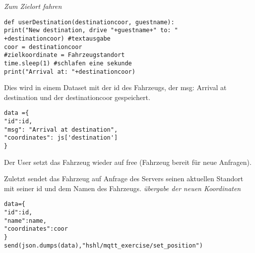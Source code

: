\textit{Zum Zielort fahren}
\begin{lstlisting}
def userDestination(destinationcoor, guestname):
print("New destination, drive "+guestname+" to: "
+destinationcoor) #textausgabe
coor = destinationcoor 
#zielkoordinate = Fahrzeugstandort
time.sleep(1) #schlafen eine sekunde
print("Arrival at: "+destinationcoor)
\end{lstlisting}

Dies wird in einem Dataset mit der id des Fahrzeugs, der msg: Arrival at destination und der destinationcoor gespeichert.

\begin{lstlisting}
data ={
"id":id,
"msg": "Arrival at destination",
"coordinates": js['destination']
}
\end{lstlisting}
Der User setzt das Fahrzeug wieder auf free (Fahrzeug bereit für neue Anfragen).


Zuletzt sendet das Fahrzeug auf Anfrage des Servers seinen aktuellen Standort mit seiner id und dem Namen des Fahrzeugs. 
\textit{übergabe der neuen Koordinaten}
\begin{lstlisting}
data={
"id":id,
"name":name,
"coordinates":coor
}
send(json.dumps(data),"hshl/mqtt_exercise/set_position")

\end{lstlisting}





















